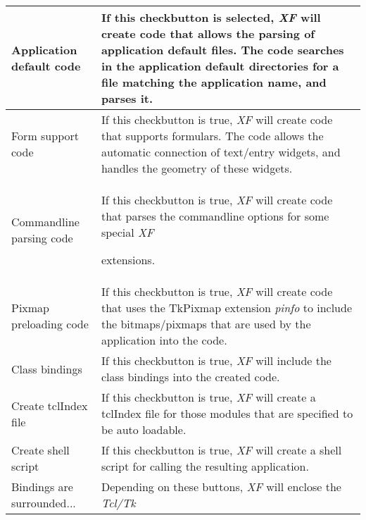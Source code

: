 {\newpage
\clearpage
\samepage \begin{supertabular}{|l|p{6.2cm}|}
Application default code     & If this checkbutton is
                               selected, {\em XF }
 will create
                               code that allows the parsing
                               of application default files.
                               The code searches in the
                               application default
                               directories for a file
                               matching the application
                               name, and parses it.\\  \hline
Form support code            & If this checkbutton is true,
                               {\em XF }
 will create code that
                               supports formulars. The code
                               allows the automatic
                               connection of text/entry
                               widgets, and handles the
                               geometry of these widgets.\\  \hline
Commandline parsing code     & If this checkbutton is true,
                               {\em XF }
 will create code that
                               parses the commandline
                               options for some special {\em XF }

                               extensions.\\  \hline
Pixmap preloading code       & If this checkbutton is true,
                               {\em XF }
 will create code that
                               uses the TkPixmap extension
                               {\em pinfo\em} to include the
                               bitmaps/pixmaps that are used
                               by the application into the
                               code.\\  \hline
Class bindings               & If this checkbutton is true,
                               {\em XF }
 will include the class
                               bindings into the created
                               code.\\  \hline
Create tclIndex file         & If this checkbutton is true,
                               {\em XF }
 will create a tclIndex
                               file for those modules that
                               are specified to be auto
                               loadable.\\  \hline
Create shell script          & If this checkbutton is true,
                               {\em XF }
 will create a shell
                               script for calling the
                               resulting application.\\  \hline
Bindings are surrounded...   & Depending on these buttons,
                               {\em XF }
 will enclose the {\em Tcl/Tk }


\end{supertabular}}
